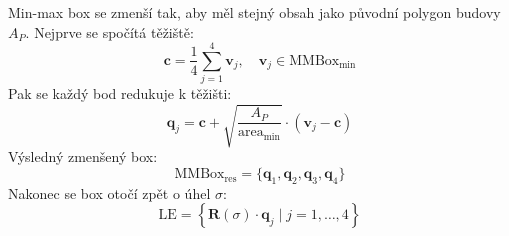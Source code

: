 Min-max box se zmenší tak, aby měl stejný obsah jako původní polygon budovy\( A_P \). Nejprve se spočítá těžiště:
\begin{equation}
\mathbf{c} = \frac{1}{4} \sum_{j=1}^4 \mathbf{v}_j, \quad \mathbf{v}_j \in \text{MMBox}_{\min}
\end{equation}
Pak se každý bod redukuje k těžišti:
\begin{equation}
    \mathbf{q}_j = \mathbf{c} + \sqrt{\frac{A_P}{\text{area}_{\min}}} \cdot (\mathbf{v}_j - \mathbf{c})
\end{equation}
Výsledný zmenšený box:
\begin{equation}
\text{MMBox}_{\text{res}} = \{ \mathbf{q}_1, \mathbf{q}_2, \mathbf{q}_3, \mathbf{q}_4 \}
\end{equation}
Nakonec se box otočí zpět o úhel \( \sigma \):
\begin{equation}
    \text{LE} = \left\{ \mathbf{R}(\sigma) \cdot \mathbf{q}_j \mid j = 1,\dots,4 \right\}
\end{equation}



